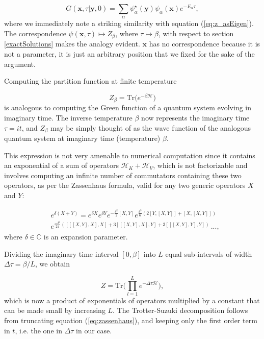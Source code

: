 \documentclass[10pt, twocolumn, twoside]{article}
\begin{document}
\begin{equation}
G (\bm x, \tau | \bm y, 0) = \sum_\alpha \psi_\alpha^\star (\bm y) \psi_\alpha (\bm x) e^{-E_\alpha \tau} ,
\end{equation}
where we immediately note a striking similarity with equation (\ref{eq:z_asEigen}). The correspondence $\psi (\bm x, \tau) \mapsto Z_\beta$, where $\tau \mapsto \beta$, with respect to section \ref{exactSolutions} makes the analogy evident. $\bm x$ has no correspondence because it is not a parameter, it is just an arbitrary position that we fixed for the sake of the argument.

Computing the partition function at finite temperature

\begin{equation}
Z_\beta = \text{Tr} \big( e^{-\beta \mathcal{H} } \big)
\end{equation}
is analogous to computing the Green function of a quantum system evolving in imaginary time. The inverse temperature $\beta$ now represents the imaginary time $\tau = it$, and $Z_\beta$ may be simply thought of as the wave function of the analogous quantum system at imaginary time (temperature) $\beta$.
 
This expression is not very amenable to numerical computation since it contains an exponential of a sum of operators $\mathcal{H}_K + \mathcal{H}_V$, which is not factorizable and involves computing an infinite number of commutators containing these two operators, as per the Zassenhaus formula, valid for any two generic operators $X$ and $Y$:

\begin{equation}\label{eq:zassenhaus}
\begin{split}
&e^{\delta (X+Y)}=e^{\delta X} e^{\delta Y} e^{-{\frac {\delta^{2}}{2}}[X,Y]} e^{{\frac {\delta^{3}}{6}}(2[Y,[X,Y]]+[X,[X,Y]])} \\
&e^{{\frac {-\delta^{4}}{24}}([[[X,Y],X],X]+3[[[X,Y],X],Y]+3[[[X,Y],Y],Y])} \, ... , 
\end{split}
\end{equation}
where $\delta \in \mathbb{C}$ is an expansion parameter.

Dividing the imaginary time interval $[0, \beta ]$ into $L$ equal sub-intervals of width $\Delta \tau = \beta / L$, we obtain

\begin{equation}
Z = \text{Tr} \bigg( \prod_{l=1}^L e^{-\Delta\tau \mathcal{H} } \bigg) ,
\end{equation}
which is now a product of exponentials of operators multiplied by a constant that can be made small by increasing $L$. The Trotter-Suzuki decomposition follows from truncating equation (\ref{eq:zassenhaus}), and keeping only the first order term in $t$, i.e. the one in $\Delta \tau$ in our case.
\end{document}
